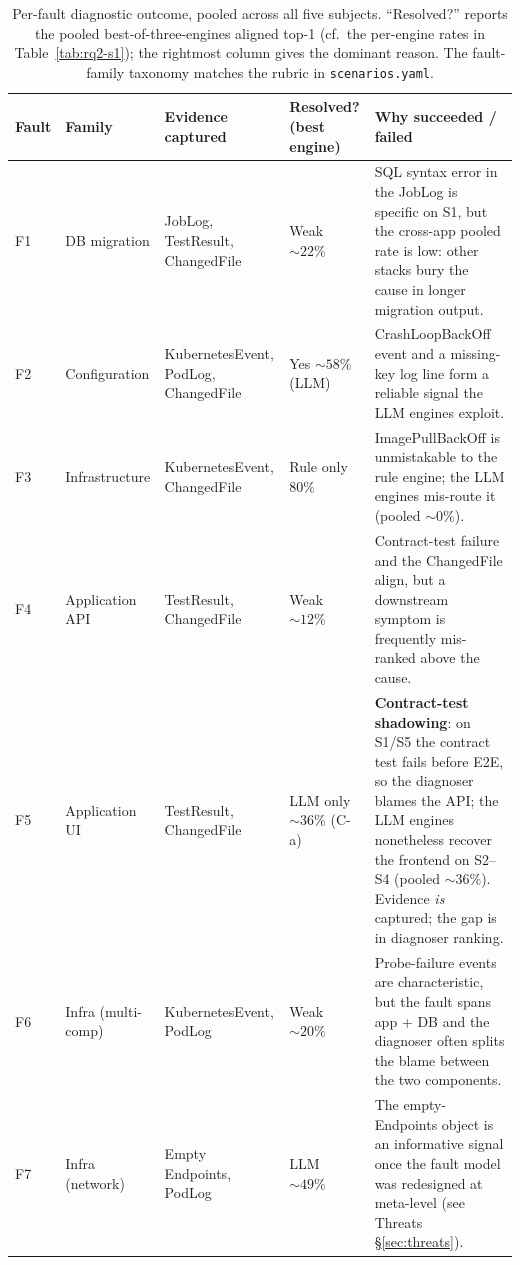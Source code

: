 \documentclass[sigconf, nonacm=true, anonymous=false, review=false]{acmart}
\newcommand{\fn}[1]{F#1\xspace}
\begin{document}
\begin{table}[t]
\centering
\caption{Per-fault diagnostic outcome, pooled across all five subjects.
``Resolved?'' reports the pooled best-of-three-engines aligned top-1
(cf.\ the per-engine rates in Table~\ref{tab:rq2-s1}); the rightmost
column gives the dominant reason. The fault-family taxonomy matches the
rubric in \texttt{scenarios.yaml}.}
\label{tab:per-fault-rca}
\scriptsize
\setlength{\tabcolsep}{4pt}
\begin{tabularx}{\textwidth}{P{0.04\textwidth} P{0.15\textwidth} P{0.20\textwidth} P{0.11\textwidth} Y}
\toprule
\textbf{Fault} & \textbf{Family} & \textbf{Evidence captured} & \textbf{Resolved? (best engine)} & \textbf{Why succeeded / failed} \\
\midrule
\fn{1}  & DB migration          & JobLog, TestResult, ChangedFile      & Weak ${\sim}22\%$    & SQL syntax error in the JobLog is specific on S1, but the cross-app pooled rate is low: other stacks bury the cause in longer migration output. \\
\fn{2}  & Configuration         & KubernetesEvent, PodLog, ChangedFile & Yes ${\sim}58\%$ (LLM) & CrashLoopBackOff event and a missing-key log line form a reliable signal the LLM engines exploit. \\
\fn{3}  & Infrastructure        & KubernetesEvent, ChangedFile         & Rule only $80\%$    & ImagePullBackOff is unmistakable to the rule engine; the LLM engines mis-route it (pooled ${\sim}0\%$). \\
\fn{4}  & Application API       & TestResult, ChangedFile              & Weak ${\sim}12\%$   & Contract-test failure and the ChangedFile align, but a downstream symptom is frequently mis-ranked above the cause. \\
\fn{5}  & Application UI        & TestResult, ChangedFile              & LLM only ${\sim}36\%$ (C-a) & \textbf{Contract-test shadowing}: on S1/S5 the contract test fails before E2E, so the diagnoser blames the API; the LLM engines nonetheless recover the frontend on S2--S4 (pooled ${\sim}36\%$). Evidence \emph{is} captured; the gap is in diagnoser ranking. \\
\fn{6}  & Infra (multi-comp)    & KubernetesEvent, PodLog              & Weak ${\sim}20\%$   & Probe-failure events are characteristic, but the fault spans app + DB and the diagnoser often splits the blame between the two components. \\
\fn{7}  & Infra (network)       & Empty Endpoints, PodLog              & LLM ${\sim}49\%$    & The empty-Endpoints object is an informative signal once the fault model was redesigned at meta-level (see Threats §\ref{sec:threats}). \\

\end{tabularx}
\end{table}
\end{document}
